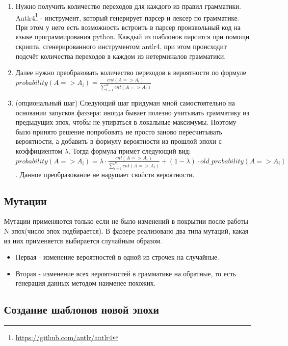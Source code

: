 \documentclass[a4paper]{article}
\begin{document}
\begin{enumerate}
    \item Нужно получить количество переходов для каждого из правил грамматики. Antlr4\footnote{\href{https://github.com/antlr/antlr4}{https://github.com/antlr/antlr4}} - инструмент, который генерирует парсер и лексер по грамматике. При этом у него есть возможность встроить в парсер произвольный код на языке программирования python. Каждый из шаблонов парсится при помощи скрипта, сгенерированного инструментом antlr4, при этом происходит подсчёт количества переходов в каждом из нетерминалов грамматики.
    \item Далее нужно преобразовать количество переходов в вероятности по формуле $probability (A => A_i) = \frac{cnt(A => A_i)}{\sum_{i=1}^{N}cnt(A => A_i)}$
    \item (опциональный шаг) Следующий шаг придуман мной самостоятельно на основании запусков фаззера: иногда бывает полезно учитывать грамматику из предыдущих эпох, чтобы не упираться в локальные максимумы. Поэтому было принято решение попробовать не просто заново пересчитывать вероятности, а добавить в формулу вероятности из прошлой эпохи с коэффициентом $\lambda$. Тогда формула примет следующий вид: $probability (A => A_i) = \lambda \cdot \frac{cnt(A => A_i)}{\sum_{i=1}^{N}cnt(A => A_i)} + (1 - \lambda) \cdot old\_probability (A => A_i)$. Данное преобразование не нарушает свойств вероятности.
\end{enumerate}

\subsection{Мутации}

Мутации применяются только если не было изменений в покрытии после работы N эпох(число эпох подбирается). В фаззере реализовано два типа мутаций, какая из них применяется выбирается случайным образом.
\begin{itemize}
    \item Первая - изменение вероятностей в одной из строчек на случайные.
    \item Вторая - изменение всех вероятностей в грамматике на обратные, то есть генерация данных методом наименее похожих.
\end{itemize}

\subsection{Создание шаблонов новой эпохи}
\end{document}
